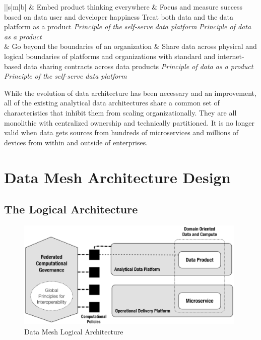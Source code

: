 \documentclass[12pt, a4paper]{book}
\begin{document}
\begin{xltabular}{\textwidth}{||s|m|b|}
		& Embed product thinking everywhere & Focus and measure success based on data user and developer happiness \newline Treat both data and the data platform as a product \newline \textit{Principle of the self-serve data platform} \newline \textit{Principle of data as a product} \\
		& Go beyond the boundaries of an organization & Share data across physical and logical boundaries of platforms and organizations with standard and internet-based data sharing contracts across data products \newline \textit{Principle of data as a product} \newline \textit{Principle of the self-serve data platform} \\
	\end{xltabular}

While the evolution of data architecture has been necessary and an improvement, all of the existing analytical data architectures share a common set of characteristics that inhibit them from scaling organizationally. They are all monolithic with centralized ownership and technically partitioned. It is no longer valid when data gets sources from hundreds of microservices and millions of devices from within and outside of enterprises.

\section{Data Mesh Architecture Design}
\subsection{The Logical Architecture}
\begin{figure}[h]
	\begin{framed}
		\centering
		\includegraphics[width=11cm]{LogicalArchitecture.png}
		\caption{Data Mesh Logical Architecture \cite{machado2022data}}
		\label{LogicalArchitecture}
	\end{framed}
\end{figure}
\end{document}
